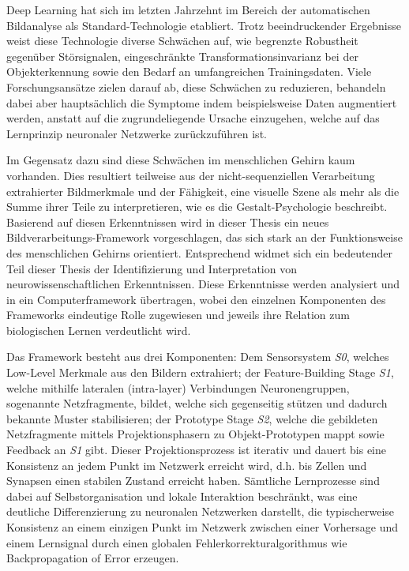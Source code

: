 Deep Learning hat sich im letzten Jahrzehnt im Bereich der automatischen Bildanalyse als Standard-Technologie etabliert.
Trotz beeindruckender Ergebnisse weist diese Technologie diverse Schwächen auf, wie begrenzte Robustheit gegenüber Störsignalen, eingeschränkte Transformationsinvarianz bei der Objekterkennung sowie den Bedarf an umfangreichen Trainingsdaten.
Viele Forschungsansätze zielen darauf ab, diese Schwächen zu reduzieren, behandeln dabei aber hauptsächlich die Symptome indem beispielsweise Daten augmentiert werden, anstatt auf die zugrundeliegende Ursache einzugehen, welche auf das Lernprinzip neuronaler Netzwerke zurückzuführen ist.

Im Gegensatz dazu sind diese Schwächen im menschlichen Gehirn kaum vorhanden.
Dies resultiert teilweise aus der nicht-sequenziellen Verarbeitung extrahierter Bildmerkmale und der Fähigkeit, eine visuelle Szene als mehr als die Summe ihrer Teile zu interpretieren, wie es die Gestalt-Psychologie beschreibt.
Basierend auf diesen Erkenntnissen wird in dieser Thesis ein neues Bildverarbeitungs-Framework vorgeschlagen, das sich stark an der Funktionsweise des menschlichen Gehirns orientiert.
Entsprechend widmet sich ein bedeutender Teil dieser Thesis der Identifizierung und Interpretation von neurowissenschaftlichen Erkenntnissen.
Diese Erkenntnisse werden analysiert und in ein Computerframework übertragen, wobei den einzelnen Komponenten des Frameworks eindeutige Rolle zugewiesen und jeweils ihre Relation zum biologischen Lernen verdeutlicht wird.

Das Framework besteht aus drei Komponenten: Dem Sensorsystem \emph{S0}, welches Low-Level Merkmale aus den Bildern extrahiert; der Feature-Building Stage \emph{S1}, welche mithilfe lateralen (intra-layer) Verbindungen Neuronengruppen, sogenannte Netzfragmente, bildet, welche sich gegenseitig stützen und dadurch bekannte Muster stabilisieren; der Prototype Stage \emph{S2}, welche die gebildeten Netzfragmente  mittels Projektionsphasern zu Objekt-Prototypen mappt sowie Feedback an \emph{S1} gibt.
Dieser Projektionsprozess ist iterativ und dauert bis eine Konsistenz an jedem Punkt im Netzwerk erreicht wird, d.h. bis Zellen und Synapsen einen stabilen Zustand erreicht haben.
Sämtliche Lernprozesse sind dabei auf Selbstorganisation und lokale Interaktion beschränkt, was eine deutliche Differenzierung zu neuronalen Netzwerken darstellt, die typischerweise Konsistenz an einem einzigen Punkt im Netzwerk zwischen einer Vorhersage und einem Lernsignal durch einen globalen Fehlerkorrekturalgorithmus wie Backpropagation of Error erzeugen.

